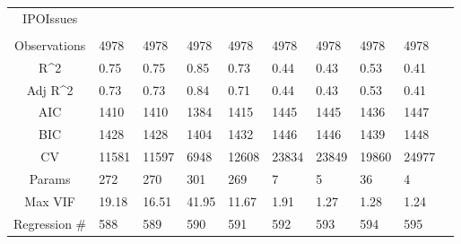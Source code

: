 \documentclass{article}
\begin{document}
\begin{table}[H]
\begin{tabular}{|clllllllll|}
  IPOIssues &  &  &  &  &  &  &  &  & \\ 
   &  &  &  &  &  &  &  &  & \\ 
  \hline 
 Observations & 4978 & 4978 & 4978 & 4978 & 4978 & 4978 & 4978 & 4978 & \\ 
  R^2 & 0.75 & 0.75 & 0.85 & 0.73 & 0.44 & 0.43 & 0.53 & 0.41 & \\ 
  Adj R^2 & 0.73 & 0.73 & 0.84 & 0.71 & 0.44 & 0.43 & 0.53 & 0.41 & \\ 
  AIC & 1410 & 1410 & 1384 & 1415 & 1445 & 1445 & 1436 & 1447 & \\ 
  BIC & 1428 & 1428 & 1404 & 1432 & 1446 & 1446 & 1439 & 1448 & \\ 
  CV & 11581 & 11597 & 6948 & 12608 & 23834 & 23849 & 19860 & 24977 & \\ 
  Params & 272 & 270 & 301 & 269 & 7 & 5 & 36 & 4 & \\ 
  Max VIF & 19.18 & 16.51 & 41.95 & 11.67 & 1.91 & 1.27 & 1.28 & 1.24 & \\ 
  Regression \# & 588 & 589 & 590 & 591 & 592 & 593 & 594 & 595 & \\ 
   \hline
\end{tabular}
 
\end{table}
\end{document}
